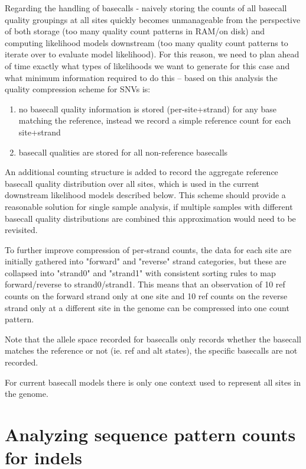 \documentclass{article}
\begin{document}
Regarding the handling of basecalls - naively storing  the counts of all basecall quality groupings at all sites quickly becomes unmanageable from the perspective of both storage (too many quality count patterns in RAM/on disk) and computing likelihood models downstream (too many quality count patterns to iterate over to evaluate model likelihood). For this reason, we need to plan ahead of time exactly what types of likelihoods we want to generate for this case and what minimum information required to do this -- based on this analysis the quality compression scheme for SNVs is:

\begin{enumerate}
\item no basecall quality information is stored (per-site+strand) for any base matching the reference, instead we record a simple reference count for each site+strand
\item basecall qualities are stored for all non-reference basecalls
\end{enumerate}

An additional counting structure is added to record the aggregate reference basecall quality distribution over all sites, which is used in the current downstream likelihood models described below. This scheme should provide a reasonable solution for single sample analysis, if multiple samples with different basecall quality distributions are combined this approximation would need to be revisited.

To further improve compression of per-strand counts, the data for each site are initially gathered into "forward" and "reverse" strand categories, but these are collapsed into "strand0" and "strand1" with consistent sorting rules to map forward/reverse to strand0/strand1. This means that an observation of 10 ref counts on the forward strand only at one site and 10 ref counts on the reverse strand only at a different site in the genome can be compressed into one count pattern.

Note that the allele space recorded for basecalls only records whether the basecall matches the reference or not (ie. ref and alt states), the specific basecalls are not recorded.

For current basecall models there is only one context used to represent all sites in the genome.


\section{Analyzing sequence pattern counts for indels}
\end{document}

